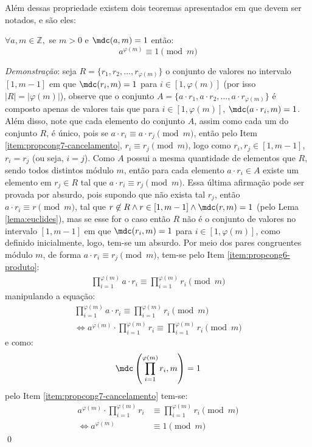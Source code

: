 Além dessas propriedade existem dois teoremas apresentados em \cite[p.~49-50]{book:2399854} que devem ser notados, e são eles:

\begin{teorema}
\label{eq : euler-fermat}
$\forall a, m \in \mathbb{Z},$ se  $ m > 0$  e $\mdc(a,m) = 1$ então:
    \begin{equation*}
        a^{\varphi(m)} \equiv 1 \pmod{m}
    \end{equation*}
\end{teorema}

\noindent
\textit{Demonstração}: seja $R = \{r_1, r_2, ..., r_{\varphi(m)}\}$ o conjunto de valores no intervalo $[1, m-1]$ em que $\mdc(r_i, m) = 1$ para $i \in [1, \varphi(m)]$ (por isso $|R| = |\varphi(m)|$), observe que o conjunto $A = \{a \cdot r_1, a \cdot r_2, ..., a \cdot r_{\varphi(m)}\}$ é composto apenas de valores tais que para $i \in [1, \varphi(m)]$, $\mdc(a \cdot r_i, m) = 1$. Além disso, note que cada elemento do conjunto $A$, assim como cada um do conjunto $R$, é único, pois se $a \cdot r_i \equiv a \cdot r_j \pmod{m}$, então pelo Item \ref{item:propcong7-cancelamento}, $r_i \equiv r_j \pmod{m}$, logo como $r_i, r_j \in [1, m-1]$, $r_i = r_j$ (ou seja, $i = j$). Como $A$ possui a mesma quantidade de elementos que $R$, sendo todos distintos módulo $m$, então para cada elemento $a \cdot r_i \in A$ existe um elemento em $r_j \in R$ tal que $a \cdot r_i \equiv r_j \pmod{m}$. Essa última afirmação pode ser provada por absurdo, pois supondo que não exista tal $r_j$, então $a \cdot r_i \equiv r \pmod{m}$, tal que $r \not\in R \land r \in [1, m-1] \land \mdc(r, m) = 1$ (pelo Lema \ref{lema:euclides}), mas se esse for o caso então $R$ não é o conjunto de valores no intervalo $[1, m-1]$ em que $\mdc(r_i, m) = 1$ para $i \in [1, \varphi(m)]$, como definido inicialmente, logo, tem-se um absurdo.
Por meio dos pares congruentes módulo $m$, de forma $a \cdot r_i \equiv r_j \pmod{m}$, tem-se pelo Item \ref{item:propcong6-produto}:
\begin{align*}
    \prod_{i = 1}^{\varphi(m)} a \cdot r_i \equiv \prod_{i = 1}^{\varphi(m)} r_i \pmod{m}
\end{align*}
manipulando a equação:
\begin{align*}
    \prod_{i = 1}^{\varphi(m)} a \cdot r_i \equiv \prod_{i = 1}^{\varphi(m)} r_i \pmod{m}
    \\
    \Longleftrightarrow a^{\varphi(m)} \cdot \prod_{i = 1}^{\varphi(m)} r_i \equiv \prod_{i = 1}^{\varphi(m)} r_i \pmod{m}
\end{align*}
e como:
\begin{equation*}
    \mdc\left(\prod_{i = 1}^{\varphi(m)} r_i, m\right) = 1
\end{equation*}
pelo Item \ref{item:propcong7-cancelamento} tem-se:
\begin{align*}
    a^{\varphi(m)} \cdot \prod_{i = 1}^{\varphi(m)} r_i & \equiv \prod_{i = 1}^{\varphi(m)} r_i \pmod{m}
    \\
    \Longleftrightarrow a^{\varphi(m)} & \equiv 1 \pmod{m} 
\end{align*} \qed

